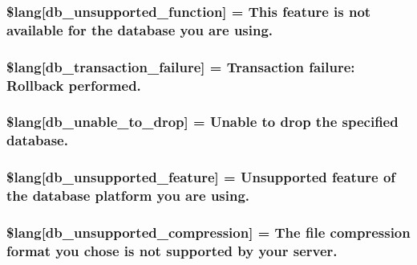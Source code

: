 \subsubsection[{\$lang}]{\setlength{\rightskip}{0pt plus 5cm}\$lang\mbox{[}\textquotesingle{}db\+\_\+unsupported\+\_\+function\textquotesingle{}\mbox{]} = \textquotesingle{}This feature is not available {\bf for} the database you are using.\textquotesingle{}}\label{db__lang_8php_a77c256be8532e23e8463481f51732116}
\hypertarget{db__lang_8php_a35f225a7ead01f13f8c6423b7c7433a0}{}
\subsubsection[{\$lang}]{\setlength{\rightskip}{0pt plus 5cm}\$lang\mbox{[}\textquotesingle{}db\+\_\+transaction\+\_\+failure\textquotesingle{}\mbox{]} = \textquotesingle{}Transaction failure\+: Rollback performed.\textquotesingle{}}\label{db__lang_8php_a35f225a7ead01f13f8c6423b7c7433a0}
\hypertarget{db__lang_8php_af391f0d50d64cbb95cd733fa947fdb5e}{}
\subsubsection[{\$lang}]{\setlength{\rightskip}{0pt plus 5cm}\$lang\mbox{[}\textquotesingle{}db\+\_\+unable\+\_\+to\+\_\+drop\textquotesingle{}\mbox{]} = \textquotesingle{}Unable to drop the specified database.\textquotesingle{}}\label{db__lang_8php_af391f0d50d64cbb95cd733fa947fdb5e}
\hypertarget{db__lang_8php_ac9a47dcf094e785346ea1834e63df941}{}
\subsubsection[{\$lang}]{\setlength{\rightskip}{0pt plus 5cm}\$lang\mbox{[}\textquotesingle{}db\+\_\+unsupported\+\_\+feature\textquotesingle{}\mbox{]} = \textquotesingle{}Unsupported feature of the database platform you are using.\textquotesingle{}}\label{db__lang_8php_ac9a47dcf094e785346ea1834e63df941}
\hypertarget{db__lang_8php_ae745d23d59478f529442768816df6f36}{}
\subsubsection[{\$lang}]{\setlength{\rightskip}{0pt plus 5cm}\$lang\mbox{[}\textquotesingle{}db\+\_\+unsupported\+\_\+compression\textquotesingle{}\mbox{]} = \textquotesingle{}The file compression format you chose is not supported by your server.\textquotesingle{}}\label{db__lang_8php_ae745d23d59478f529442768816df6f36}
\hypertarget{db__lang_8php_a0519c50a806cec99f29b499aec2582e5}{}
